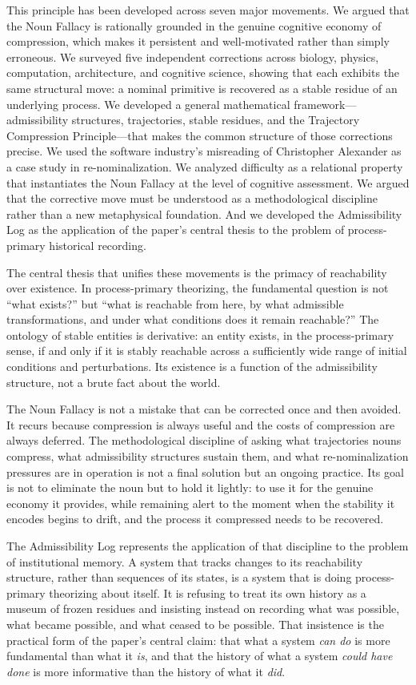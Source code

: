 \documentclass[12pt, a4paper]{article}
\theoremstyle{plain}
\theoremstyle{definition}
\theoremstyle{remark}
\begin{document}
This principle has been developed across seven major movements. We argued that
the Noun Fallacy is rationally grounded in the genuine cognitive economy of
compression, which makes it persistent and well-motivated rather than simply
erroneous. We surveyed five independent corrections across biology, physics,
computation, architecture, and cognitive science, showing that each exhibits
the same structural move: a nominal primitive is recovered as a stable residue
of an underlying process. We developed a general mathematical framework---
admissibility structures, trajectories, stable residues, and the Trajectory
Compression Principle---that makes the common structure of those corrections
precise. We used the software industry's misreading of Christopher Alexander
as a case study in re-nominalization. We analyzed difficulty as a relational
property that instantiates the Noun Fallacy at the level of cognitive
assessment. We argued that the corrective move must be understood as a
methodological discipline rather than a new metaphysical foundation.
And we developed the Admissibility Log as the application of the paper's
central thesis to the problem of process-primary historical recording.

The central thesis that unifies these movements is the primacy of reachability
over existence. In process-primary theorizing, the fundamental question is
not ``what exists?'' but ``what is reachable from here, by what admissible
transformations, and under what conditions does it remain reachable?'' The
ontology of stable entities is derivative: an entity exists, in the
process-primary sense, if and only if it is stably reachable across a
sufficiently wide range of initial conditions and perturbations. Its existence
is a function of the admissibility structure, not a brute fact about the world.

The Noun Fallacy is not a mistake that can be corrected once and then avoided.
It recurs because compression is always useful and the costs of compression
are always deferred. The methodological discipline of asking what trajectories
nouns compress, what admissibility structures sustain them, and what
re-nominalization pressures are in operation is not a final solution but an
ongoing practice. Its goal is not to eliminate the noun but to hold it
lightly: to use it for the genuine economy it provides, while remaining alert
to the moment when the stability it encodes begins to drift, and the process
it compressed needs to be recovered.

The Admissibility Log represents the application of that discipline to the
problem of institutional memory. A system that tracks changes to its
reachability structure, rather than sequences of its states, is a system
that is doing process-primary theorizing about itself. It is refusing to
treat its own history as a museum of frozen residues and insisting instead
on recording what was possible, what became possible, and what ceased to be
possible. That insistence is the practical form of the paper's central claim:
that what a system \emph{can do} is more fundamental than what it \emph{is},
and that the history of what a system \emph{could have done} is more
informative than the history of what it \emph{did}.
\end{document}

